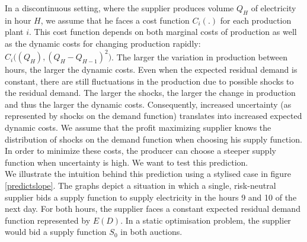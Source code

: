 In a discontinuous setting, where the supplier produces volume $Q_H$ of electricity in hour $H$, we assume that he faces a cost function $C_i(.)$ for each production plant $i$. This cost function depends on both marginal costs of production as well as the dynamic costs for changing production rapidly: $C_i \bigl( (Q_H), (Q_H - Q_{H-1})^2 \bigr)$. The larger the variation in production between hours, the larger the dynamic costs. 
Even when the expected residual demand is constant, there are still fluctuations in the production due to possible shocks to the residual demand. The larger the shocks, the larger the change in production and thus the larger the dynamic costs. 
Consequently, increased uncertainty (as represented by shocks on the demand function) translates into increased expected dynamic costs. We assume that the profit maximizing supplier knows the distribution of shocks on the demand function when choosing his supply function.  In order to minimize these costs, the producer can choose a steeper supply function when uncertainty is high. We want to test this prediction. \\

We illustrate the intuition behind this prediction using a stylised case in figure \ref{predictslope}. The graphs depict a situation in which a single, risk-neutral supplier bids a supply function to supply electricity in the hours 9 and 10 of the next day. For both hours, the supplier faces a constant expected residual demand function represented by $E(D)$. In a static optimisation problem, the supplier would bid a supply function $S_0$ in both auctions. \\

